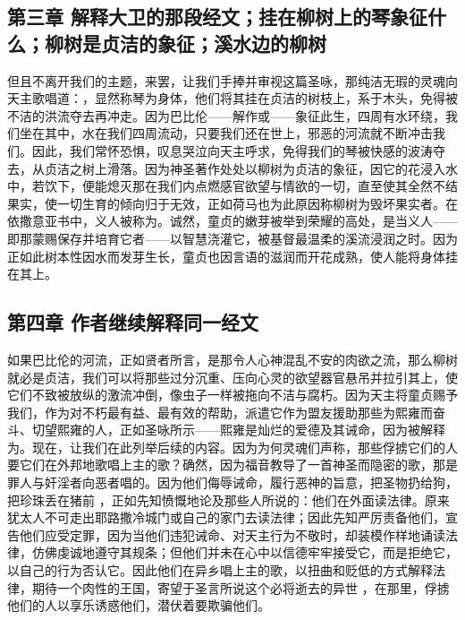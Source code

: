 \subsection{第三章 解释大卫的那段经文；挂在柳树上的琴象征什么；柳树是贞洁的象征；溪水边的柳树}

但且不离开我们的主题，来罢，让我们手捧并审视这篇圣咏，那纯洁无瑕的灵魂向天主歌唱道：，显然称琴为身体，他们将其挂在贞洁的树枝上，系于木头，免得被不洁的洪流夺去再冲走。因为巴比伦——解作或——象征此生，四周有水环绕，我们坐在其中，水在我们四周流动，只要我们还在世上，邪恶的河流就不断冲击我们。因此，我们常怀恐惧，叹息哭泣向天主呼求，免得我们的琴被快感的波涛夺去，从贞洁之树上滑落。因为神圣著作处处以柳树为贞洁的象征，因它的花浸入水中，若饮下，便能熄灭那在我们内点燃感官欲望与情欲的一切，直至使其全然不结果实，使一切生育的倾向归于无效，正如荷马也为此原因称柳树为毁坏果实者。在依撒意亚书中，义人被称为。诚然，童贞的嫩芽被举到荣耀的高处，是当义人——即那蒙赐保存并培育它者——以智慧浇灌它，被基督最温柔的溪流浸润之时。因为正如此树本性因水而发芽生长，童贞也因言语的滋润而开花成熟，使人能将身体挂在其上。\par


\subsection{第四章 作者继续解释同一经文}

如果巴比伦的河流，正如贤者所言，是那令人心神混乱不安的肉欲之流，那么柳树就必是贞洁，我们可以将那些过分沉重、压向心灵的欲望器官悬吊并拉引其上，使它们不致被放纵的激流冲倒，像虫子一样被拖向不洁与腐朽。因为天主将童贞赐予我们，作为对不朽最有益、最有效的帮助，派遣它作为盟友援助那些为熙雍而奋斗、切望熙雍的人，正如圣咏所示——熙雍是灿烂的爱德及其诫命，因为被解释为。现在，让我们在此列举后续的内容。因为为何灵魂们声称，那些俘掳它们的人要它们在外邦地歌唱上主的歌？确然，因为福音教导了一首神圣而隐密的歌，那是罪人与奸淫者向恶者唱的。因为他们侮辱诫命，履行恶神的旨意，把圣物扔给狗，把珍珠丢在猪前 ，正如先知愤慨地论及那些人所说的：他们在外面读法律。原来犹太人不可走出耶路撒冷城门或自己的家门去读法律；因此先知严厉责备他们，宣告他们应受定罪，因为当他们违犯诫命、对天主行为不敬时，却装模作样地诵读法律，仿佛虔诚地遵守其规条；但他们并未在心中以信德牢牢接受它，而是拒绝它，以自己的行为否认它。因此他们在异乡唱上主的歌，以扭曲和贬低的方式解释法律，期待一个肉性的王国，寄望于圣言所说这个必将逝去的异世 ，在那里，俘掳他们的人以享乐诱惑他们，潜伏着要欺骗他们。\newline{}\par

